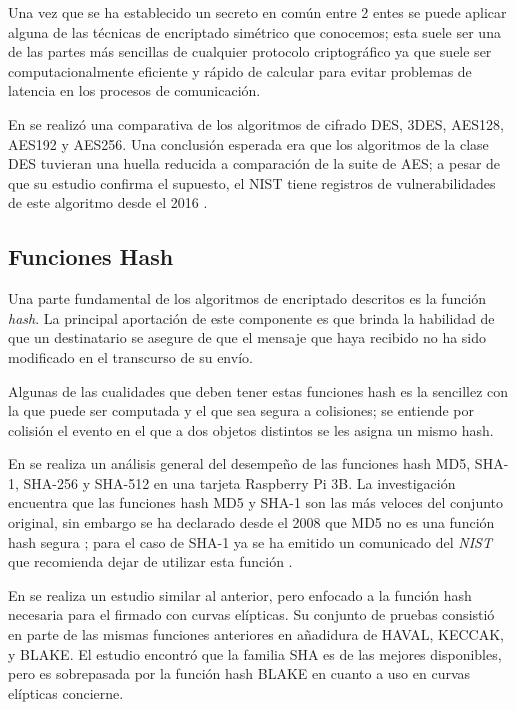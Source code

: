 \documentclass{article}
\begin{document}
            Una vez que se ha establecido un secreto en común entre 2 entes se puede aplicar alguna de las técnicas de encriptado simétrico que conocemos; esta suele ser una de las partes más sencillas de cualquier protocolo criptográfico ya que suele ser computacionalmente eficiente y rápido de calcular para evitar problemas de latencia en los procesos de comunicación.

            En \cite{el2018analysis} se realizó una comparativa de los algoritmos de cifrado DES, 3DES, AES128, AES192 y AES256. Una conclusión esperada era que los algoritmos de la clase DES tuvieran una huella reducida a comparación de la suite de AES; a pesar de que su estudio confirma el supuesto, el NIST tiene registros de vulnerabilidades de este algoritmo desde el 2016 \cite{des_vulnerable}.

        \subsection{Funciones Hash}

            Una parte fundamental de los algoritmos de encriptado descritos es la función \textit{hash}. La principal aportación de este componente es que brinda la habilidad de que un destinatario se asegure de que el mensaje que haya recibido no ha sido modificado en el transcurso de su envío.

            Algunas de las cualidades que deben tener estas funciones hash es la sencillez con la que puede ser computada y el que sea segura a colisiones; se entiende por colisión el evento en el que a dos objetos distintos se les asigna un mismo hash.

            En \cite{el2018analysis} se realiza un análisis general del desempeño de las funciones hash MD5, SHA-1, SHA-256 y SHA-512 en una tarjeta Raspberry Pi 3B. La investigación encuentra que las funciones hash MD5 y SHA-1 son las más veloces del conjunto original, sin embargo se ha declarado desde el 2008 que MD5 no es una función hash segura \cite{md5_vulnerable}; para el caso de SHA-1 ya se ha emitido un comunicado del \textit{NIST} que recomienda dejar de utilizar esta función \cite{sha1_vulnerable}.

            En \cite{rao2019comparative} se realiza un estudio similar al anterior, pero enfocado a la función hash necesaria para el firmado con curvas elípticas. Su conjunto de pruebas consistió en parte de las mismas funciones anteriores en añadidura de HAVAL, KECCAK, y BLAKE. El estudio encontró que la familia SHA es de las mejores disponibles, pero es sobrepasada por la función hash BLAKE en cuanto a uso en curvas elípticas concierne.
\end{document}
